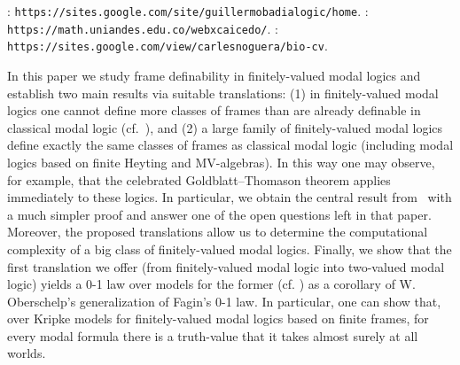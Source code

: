 \documentclass[bsl,meeting]{asl}
\def\urladdr#1{\endgraf\noindent{\it URL Address}: {\tt #1}.}
\newcommand{\NP}{}
\begin{document}
\thispagestyle{empty}


\NP  
{}
\urladdr{https://sites.google.com/site/guillermobadialogic/home}
%
\urladdr{https://math.uniandes.edu.co/webxcaicedo/}
%
\urladdr{https://sites.google.com/view/carlesnoguera/bio-cv}



In this paper we study frame definability in finitely-valued modal logics and establish two main results via suitable translations: (1) in finitely-valued modal logics one cannot define more classes of frames than are already definable in classical modal logic (cf.~\cite[Thm.~8]{tho}), and (2)  a large family of finitely-valued modal logics define exactly the same classes of frames as classical modal logic (including modal logics based on finite Heyting and MV-algebras). In this way one may observe, for example, that the celebrated Goldblatt--Thomason theorem applies immediately to these logics. In particular, we obtain the central result from~\cite{te} with a much simpler proof  and answer one of the open questions left in that paper. Moreover, the proposed translations allow us to determine the computational complexity of a big class of finitely-valued modal logics. Finally, we show that the first translation we offer  (from finitely-valued modal logic into two-valued modal logic) yields a  0-1 law over models for the former (cf. \cite{kapron1}) as a corollary of W. Oberschelp's generalization \cite{ober} of  Fagin's 0-1 law. In particular, one can show that, over Kripke models for finitely-valued modal logics based on finite frames, for every modal formula  there is a truth-value that it takes almost surely at all worlds.
\end{document}
